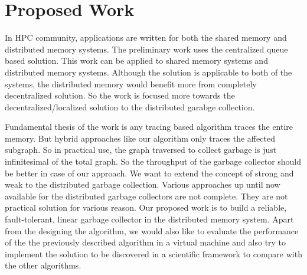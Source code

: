 \section{Proposed Work}

\iffalse
Local creation of links only allows the creation of strong references when no
cycle creation is possible. Consider the creation of a link from a source object $S$
to a target object $T$. The link will be created strong if (i) the only strong
links to $S$ are from roots i.e. there is no object $C$ with a strong link to $S$;
(ii) object $T$ has no outgoing links i.e. it is newly created and its outgoing links are
not initialized; and (iii) object $T$ is phantomized, and $S$ is not. All
self-references are weak. Any other link is created phantom or weak.
\fi


In HPC community, applications are written for both the shared memory and 
distributed memory systems. The preliminary work uses the centralized queue based 
solution. This work can be applied to shared memory systems and distributed memory 
systems. Although the solution is applicable to both of the systems, the distributed memory 
would benefit more from completely decentralized solution. So the work is focused more 
towards the decentralized/localized solution to the distributed garabge collection.




Fundamental thesis of the work is any tracing based algorithm traces the entire memory. 
But hybrid approaches like our algorithm only traces the affected subgraph. So in practical 
use, the graph traversed to collect garbage is just infinitesimal of the total graph. 
So the throughput of the garbage collector should be better in case of our approach. 
We want to extend the concept of strong and weak to the distributed garbage collection. 
Various approaches up until now available for the distributed garbage collectors are not complete.
They are not practical solution for various reason. Our proposed work is to build a reliable, 
fault-tolerant, linear garbage collector in the distributed memory system. Apart from 
the designing the algorithm, we would also like to evaluate the performance of the the 
previously described algorithm in a virtual machine and also  try to implement 
the solution to be discovered in a scientific framework to compare with the other algorithms.

